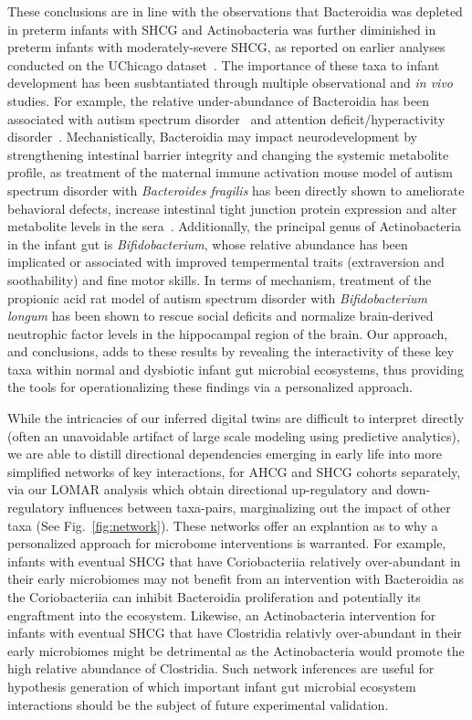 \documentclass[onecolumn,10pt]{IEEEtran}
\def\bact{Bacteroidia\xspace}
\def\actn{Actinobacteria\xspace}
\begin{document}
These conclusions are in line with the observations that  \bact was depleted in preterm infants with SHCG and \actn was further diminished in preterm infants with moderately-severe SHCG, as reported on earlier  analyses conducted on the UChicago dataset~\cite{oliphant2021bacteroidota}. The importance of these taxa to infant development has  been susbtantiated  through multiple observational and \textit{in vivo} studies. For example, the relative under-abundance of \bact has been  associated with autism spectrum disorder~\cite{kang2013} and attention deficit/hyperactivity disorder~\cite{prehn-kristensen2018}. Mechanistically, \bact may impact neurodevelopment by strengthening intestinal barrier integrity and changing the systemic metabolite profile, as treatment of the maternal immune activation mouse model of autism spectrum disorder with \textit{Bacteroides fragilis} has been directly shown to ameliorate behavioral defects, increase intestinal tight junction protein expression and alter metabolite levels in the sera~\cite{hsiao2013microbiota}. Additionally, the principal genus of \actn in the infant gut is \textit{Bifidobacterium}, whose relative abundance has been implicated or associated with improved tempermental traits (extraversion\cite{fox2022development} and soothability\cite{wang2020association}) and fine motor skills\cite{acuna2021infant}. In terms of mechanism, treatment of the propionic acid rat model of autism spectrum disorder with \textit{Bifidobacterium longum} has been shown to rescue social deficits and normalize brain-derived neutrophic factor levels in the hippocampal region of the brain\cite{abuaish2021fecal}. Our approach, and conclusions, adds to these results by revealing  the interactivity of these key taxa within normal and dysbiotic infant gut microbial ecosystems, thus providing the tools for operationalizing these findings via a personalized approach. 

While the intricacies of our inferred digital twins are difficult to interpret directly (often an unavoidable artifact of large scale modeling using predictive analytics), we are able to distill directional dependencies emerging in early life into more simplified networks of  key interactions, for AHCG and SHCG cohorts separately, via our LOMAR analysis which obtain directional up-regulatory and down-regulatory influences between taxa-pairs, marginalizing out the impact of other taxa  (See Fig.~\ref{fig:network}). These networks offer an explantion as to why a personalized approach for microbome interventions is warranted. For example, infants with eventual SHCG that have Coriobacteriia relatively over-abundant in their early microbiomes may not benefit from an intervention with \bact as the Coriobacteriia can inhibit \bact proliferation and potentially its engraftment into the ecosystem. Likewise, an \actn intervention for infants with eventual SHCG that have Clostridia relativly over-abundant in their early microbiomes might be detrimental as the \actn would promote the high relative abundance of Clostridia. Such network inferences are useful for hypothesis generation of which important infant gut microbial ecosystem interactions should be the subject of future experimental validation.
\end{document}
